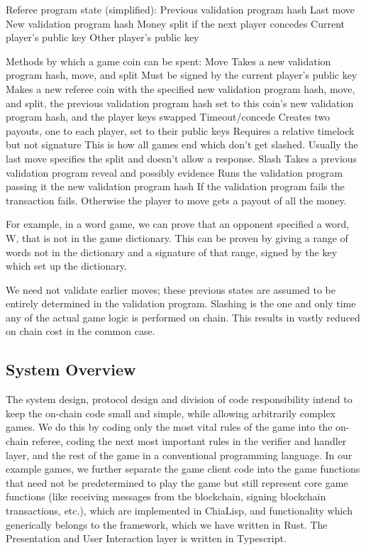 \documentclass[a4paper]{article}
\begin{document}
\begin{multicols}{2}
Referee program state (simplified):
Previous validation program hash
Last move
New validation program hash
Money split if the next player concedes
Current player’s public key
Other player’s public key

Methods by which a game coin can be spent:
Move
Takes a new validation program hash, move, and split
Must be signed by the current player’s public key
Makes a new referee coin with the specified new validation program hash, move, and split, the previous validation program hash set to this coin’s new validation program hash, and the player keys swapped
Timeout/concede
Creates two payouts, one to each player, set to their public keys
Requires a relative timelock but not signature
This is how all games end which don’t get slashed. Usually the last move specifies the split and doesn’t allow a response.
Slash
Takes a previous validation program reveal and possibly evidence
Runs the validation program passing it the new validation program hash
If the validation program fails the transaction fails. Otherwise the player to move gets a payout of all the money.

For example, in a word game, we can prove that an opponent specified a word, W, that is not in the game dictionary. This can be proven by giving a range of words not in the dictionary and a signature of that range, signed by the key which set up the dictionary.


We need not validate earlier moves; these previous states are assumed to be entirely determined in the validation program. Slashing is the one and only time any of the actual game logic is performed on chain. This results in vastly reduced on chain cost in the common case.

\subsection{System Overview}

The system design, protocol design and division of code responsibility intend to keep the on-chain code small and simple, while allowing arbitrarily complex games. We do this by coding only the most vital rules of the game into the on-chain referee, coding the next most important rules in the verifier and handler layer, and the rest of the game in a conventional programming language. In our example games, we further separate the game client code into the game functions that need not be predetermined to play the game but still represent core game functions (like receiving messages from the blockchain, signing blockchain transactions, etc.), which are implemented in ChiaLisp, and functionality which generically belongs to the framework, which we have written in Rust. The Presentation and User Interaction layer is written in Typescript.


\end{multicols}
\end{document}
